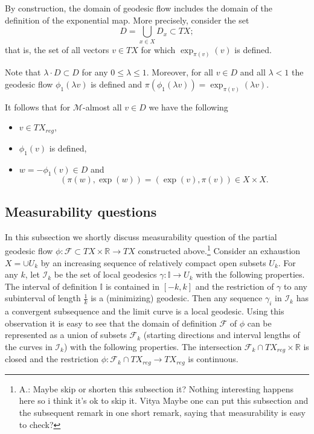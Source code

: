 \documentclass[12pt,leqno,intlimits]{amsart}
\numberwithin{equation}{section}
\theoremstyle{definition}
\theoremstyle{remark}
\newcommand{\R}{\mathbb{R}}
\newcommand{\II}{\mathbb{I}}
\begin{document}
By construction, the domain of geodesic flow includes the domain of the definition of the exponential map.
More precisely, consider the set  
\[D=\bigcup_{x\in X} D_x\subset TX;\] 
that is, the set of all vectors $v\in TX$ for which $\exp _{\pi(v)} (v)$ is defined.

Note that $\lambda\cdot D\subset D$ for any $0\leq \lambda \leq 1$.  
Moreover, for all $v\in D$ and all $\lambda <1$
the geodesic flow $\phi_1 (\lambda v)$ is defined and $\pi (\phi_1 (\lambda v))=  \exp _{\pi (v)} (\lambda v)$.

It follows that for $\mathcal M$-almost all $v\in D$ we have the following
\begin{itemize}
\item $v\in TX_{reg}$,
\item $\phi _1(v)$ is defined,
\item $w=-\phi_1 (v)\in D$ and
\begin{equation} \label{eq:symm}
(\pi (w), \exp (w))=(\exp (v), \pi (v)) \in X\times X.
\end{equation}
\end{itemize}


\subsection{Measurability questions} \label{subsec:measur} 
 In this subsection we shortly discuss measurability question of the partial geodesic flow
$\phi:\mathcal F\subset TX\times \R \to TX$ constructed above.\footnote{A.:  Maybe skip or shorten this subsection it?{\color{red} Nothing interesting happens here so i think it's ok to skip it. Vitya}   Maybe one can put this subsection and the subsequent remark in one short remark, saying that 
measurability is easy to check?}
Consider an exhaustion  $X=\cup U_k$ by an increasing sequence of relatively compact open subsets $U_k$.  
For any $k$, let $\mathcal I_k$ be the set of local geodesics $\gamma :\II\to U_k$ with the following properties. 
The interval of definition $\II$ is contained in $[- k , k]$  and the restriction of $\gamma$ to any subinterval of length $\frac 1 k$ is a (minimizing) geodesic. Then any sequence $\gamma _i$ in $\mathcal I_k$ has a convergent subsequence and the limit curve is a local geodesic.  Using this observation it is easy to see that the domain of definition $\mathcal F$
of $\phi$ can be represented as a union of subsets  $\mathcal F_k$  (starting directions and interval lengths of the curves in $\mathcal I_k$) with the following properties. The intersection  $\mathcal F_k \cap TX_{reg} \times \R$ is closed and the restriction $\phi:\mathcal F_k \cap TX_{reg} \to TX_{reg}$ is continuous.
\end{document}
